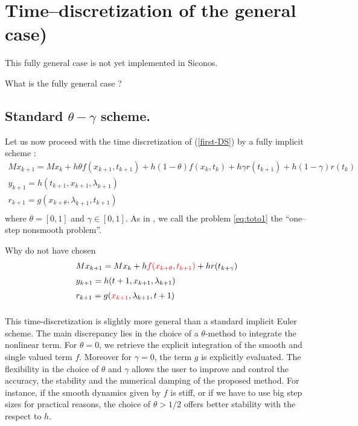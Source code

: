 \section{Time--discretization of the general case) } 

This fully general case is not yet implemented in Siconos.

\begin{ndrva}
  What is the fully general case ?
\end{ndrva}

\subsection{Standard $\theta-\gamma$ scheme.}
Let us now proceed with the time discretization of (\ref{first-DS}) by a fully implicit scheme : 
\begin{equation}
  \begin{array}{l}
    \label{eq:toto1}
     M x_{k+1} = M x_{k} +h\theta f(x_{k+1},t_{k+1})+h(1-\theta) f(x_k,t_k) + h \gamma r(t_{k+1})
     + h(1-\gamma)r(t_k)  \\[2mm]
     y_{k+1} =  h(t_{k+1},x_{k+1},\lambda _{k+1}) \\[2mm]
     r_{k+1} = g(x_{k+\theta},\lambda_{k+1},t_{k+1})\\[2mm]
  \end{array}
\end{equation}
where $\theta = [0,1]$ and $\gamma \in [0,1]$. As in \cite{acary2008}, we call the problem \eqref{eq:toto1} the ``one--step nonsmooth problem''.

\begin{ndrva}
  Why do not have chosen
  \begin{equation}
    \begin{array}{l}
      \label{eq:toto1-bis}
      M x_{k+1} = M x_{k} +h \textcolor{red}{f(x_{k+\theta},t_{k+1})} + h r(t_{k+\gamma}) \\[2mm]
      y_{k+1} =  h(t+1,x_{k+1},\lambda _{k+1}) \\[2mm]
      r_{k+1} = g(\textcolor{red}{x_{k+1}},\lambda_{k+1},t+1)\\[2mm]
    \end{array}
\end{equation}
\end{ndrva}


 This time-discretization is slightly more general than a standard implicit Euler scheme. The main discrepancy lies in the choice of a $\theta$-method to integrate the nonlinear term. For $\theta=0$, we retrieve the explicit integration of the smooth and  single valued term $f$. Moreover for $\gamma =0$, the term $g$ is explicitly evaluated. The flexibility in the choice of $\theta$ and $\gamma$ allows the user to improve and control the accuracy, the stability and the numerical damping of the proposed method. For instance, if the smooth dynamics given by $f$ is stiff, or if we have to use big step sizes for practical reasons, the choice of $\theta > 1/2$ offers better stability with the respect to $h$.

